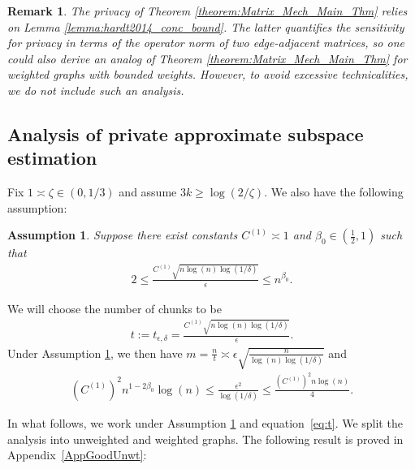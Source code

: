 \documentclass{article}
\newtheorem{remark}{Remark}
\newtheorem{assumption}{Assumption}
\begin{document}
\begin{remark}
The privacy of Theorem \ref{theorem:Matrix_Mech_Main_Thm} relies on Lemma \ref{lemma:hardt2014_conc_bound}. The latter quantifies the sensitivity for privacy in terms of the operator norm of two edge-adjacent matrices, so one could also derive an analog of Theorem \ref{theorem:Matrix_Mech_Main_Thm} for weighted graphs with bounded weights. However, to avoid excessive technicalities, we do not include such an analysis.
\end{remark}


\subsection{Analysis of private approximate subspace estimation}
\label{section:Approximate DP: Private approximate subspace estimation}

Fix $1 \asymp \zeta \in (0, 1/3)$ and assume $3k \geq \log(2/\zeta)$. We also have the following assumption: 

\begin{assumption}
\label{ASS_SE_t_m}
Suppose there exist constants $C^{(1)} \asymp 1$ and $\beta_0 \in \left(\frac{1}{2}, 1\right)$ such that
\begin{align*}
2 \leq \frac{C^{(1)}\sqrt{n\log(n)\log(1/\delta)}}{\epsilon} \leq n^{\beta_0}.
\end{align*}
\end{assumption}
We will choose the number of chunks to be
\begin{align}
\label{eq:t}
t := t_{\epsilon, \delta} = \frac{C^{(1)}\sqrt{n\log(n)\log(1/\delta)}}{\epsilon}.
\end{align}
Under Assumption \ref{ASS_SE_t_m}, we then have $m = \frac{n}{t} \asymp \epsilon\sqrt{\frac{n}{\log(n)\log(1/\delta)}}$ and 
\begin{align*}
(C^{(1)})^2n^{1 - 2\beta_0}\log(n) \leq \frac{\epsilon^2}{\log(1/\delta)} \leq \frac{(C^{(1)})^2n\log(n)}{4}.
\end{align*}

In what follows, we work under Assumption \ref{ASS_SE_t_m} and equation~\eqref{eq:t}.
We split the analysis into unweighted and weighted graphs. The following result is proved in Appendix~\ref{AppGoodUnwt}:
\end{document}

